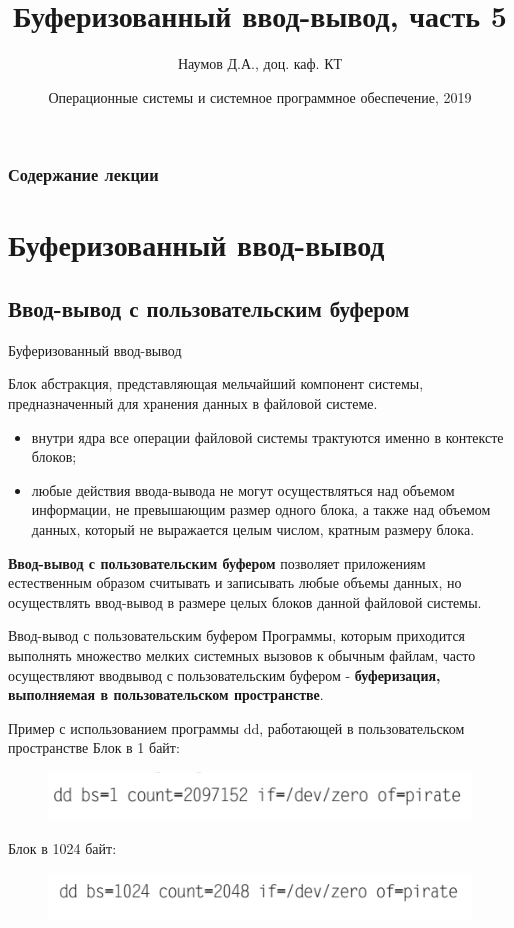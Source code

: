 \documentclass{beamer}
\title[Язык C]{Буферизованный ввод-вывод, часть 5}
\author{Наумов Д.А., доц. каф. КТ}
\date[25.09.2019] {Операционные системы и системное программное обеспечение, 2019}
\begin{document}
\begin{frame}
  \titlepage
\end{frame}
  
\begin{frame}
  \frametitle{Содержание лекции}
  \tableofcontents  
\end{frame}

\section{Буферизованный ввод-вывод}

\subsection{Ввод-вывод с пользовательским буфером}
\begin{frame}{Буферизованный ввод-вывод}
\begin{block}{Блок}
абстракция, представляющая мельчайший компонент системы, предназначенный для хранения данных в файловой системе.
\end{block}
\begin{itemize}
\item внутри ядра все операции файловой системы трактуются именно в контексте
блоков; 
\item любые действия ввода-вывода не могут осуществляться
над объемом информации, не превышающим размер одного блока, а также над
объемом данных, который не выражается целым числом, кратным размеру блока.
\end{itemize}
\textbf{Ввод-вывод с пользовательским буфером} позволяет
приложениям естественным образом считывать и записывать любые объемы
данных, но осуществлять ввод-вывод в размере целых блоков данной файловой
системы.
\end{frame}

\begin{frame}{Ввод-вывод с пользовательским буфером}
Программы, которым приходится выполнять множество мелких системных вызовов к обычным файлам, часто осуществляют ввод­вывод с пользовательским буфером - \textbf{буферизация, выполняемая в пользовательском пространстве}. 

\begin{block}{Пример с использованием программы dd, работающей в пользовательском пространстве}
Блок в 1 байт:
\begin{figure}[h]
\centering
\includegraphics[scale=0.6]{images/lec05-pic01.png}
\end{figure}
Блок в 1024 байт:
\begin{figure}[h]
\centering
\includegraphics[scale=0.6]{images/lec05-pic02.png}
\end{figure}
\end{block}
\end{frame}
\end{document}
